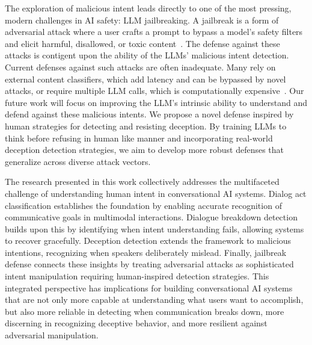 The exploration of malicious intent leads directly to one of the most pressing, modern challenges in AI safety: LLM jailbreaking. A jailbreak is a form of adversarial attack where a user crafts a prompt to bypass a model's safety filters and elicit harmful, disallowed, or toxic content~\cite{zou2023JB1, wei2023JB2}. The defense against these attacks is contigent upon the ability of the LLMs' malicious intent detection. Current defenses against such attacks are often inadequate. Many rely on external content classifiers, which add latency and can be bypassed by novel attacks, or require multiple LLM calls, which is computationally expensive~\cite{mazeika2024JB3, inan2023JB4}. Our future work will focus on improving the LLM's intrinsic ability to understand and defend against these malicious intents. We propose a novel defense inspired by human strategies for detecting and resisting deception. By training LLMs to think before refusing in human like manner and incorporating real-world deception detection strategies, we aim to develop more robust defenses that generalize across diverse attack vectors.

The research presented in this work collectively addresses the multifaceted challenge of understanding human intent in conversational AI systems. Dialog act classification establishes the foundation by enabling accurate recognition of communicative goals in multimodal interactions. Dialogue breakdown detection builds upon this by identifying when intent understanding fails, allowing systems to recover gracefully. Deception detection extends the framework to malicious intentions, recognizing when speakers deliberately mislead. Finally, jailbreak defense connects these insights by treating adversarial attacks as sophisticated intent manipulation requiring human-inspired detection strategies. This integrated perspective has implications for building conversational AI systems that are not only more capable at understanding what users want to accomplish, but also more reliable in detecting when communication breaks down, more discerning in recognizing deceptive behavior, and more resilient against adversarial manipulation.

